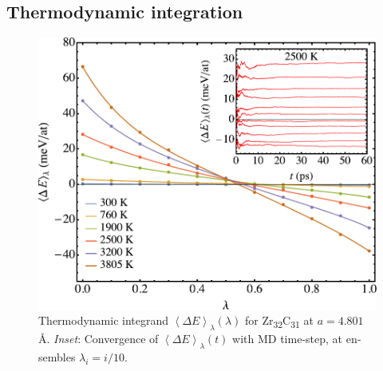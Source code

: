 \documentclass[twocolumn,american,aps,prb,showpacs,showkeys,amsmath,amssymb,superscriptaddress,a4]{revtex4-1}
\begin{document}
\subsection{Thermodynamic integration \label{subsec:Expectations-and-uncertainties}}
\begin{center}
\begin{figure}[H]
\begin{centering}
\includegraphics[scale=0.55]{Fig2_pltdUdL}
\par\end{centering}
\caption{\foreignlanguage{american}{Thermodynamic integrand $\left\langle \Delta E\right\rangle _{\lambda}(\lambda)$
for Zr\protect\textsubscript{32}C\protect\textsubscript{31} at $a=4.801$
\AA. \emph{Inset}: Convergence of $\left\langle \Delta E\right\rangle _{\lambda}(t)$
with MD time-step, at ensembles $ \lambda_{i} =i/10$.
\label{fig: pltdUdL}}}
\end{figure}
\par\end{center}
\end{document}

